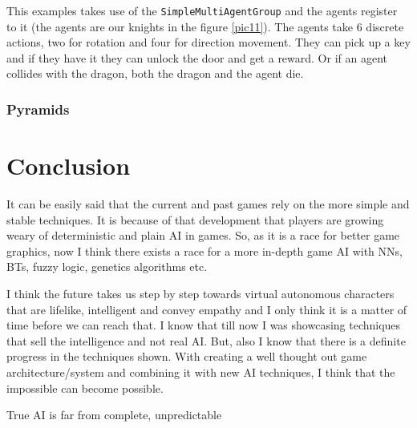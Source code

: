 \documentclass[a4paper, 12pt]{book}
\begin{document}
This examples takes use of the \texttt{SimpleMultiAgentGroup} and the agents register to it (the agents are our knights in the figure \ref{pic11}). The agents take 6 discrete actions, two for rotation and four for direction movement. They can pick up a key and if they have it they can unlock the door and get a reward. Or if an agent collides with the dragon, both the dragon and the agent die.

\subsection{Pyramids}

\chapter{Conclusion}
\label{ch4}

It can be easily said that the current and past games rely on the more simple and stable techniques. It is because of that development that players are growing weary of deterministic and plain AI in games. So, as it is a race for better game graphics, now I think there exists a race for a more in-depth game AI with NNs, BTs, fuzzy logic, genetics algorithms etc. 

I think the future takes us step by step towards virtual autonomous characters that are lifelike, intelligent and convey empathy and I only think it is a matter of time before we can reach that. I know that till now I was showcasing techniques that sell the intelligence and not real AI. But, also I know that there is a definite progress in the techniques shown. With creating a well thought out game architecture/system and combining it with new AI techniques, I think that the impossible can become possible.

True AI is far from complete, unpredictable

\cleardoublepage
{}


\end{document}

